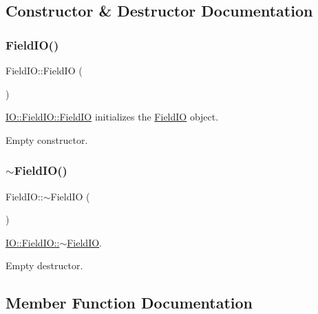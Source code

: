 \subsection{Constructor \& Destructor Documentation}
\mbox{\label{class_i_o_1_1_field_i_o_a8ea52cca792b1a0f7812881b5282edf5}} 
\subsubsection{\texorpdfstring{FieldIO()}{FieldIO()}}
{\footnotesize\ttfamily Field\+I\+O\+::\+Field\+IO (\begin{DoxyParamCaption}{ }\end{DoxyParamCaption})}



\mbox{\hyperlink{class_i_o_1_1_field_i_o_a8ea52cca792b1a0f7812881b5282edf5}{I\+O\+::\+Field\+I\+O\+::\+Field\+IO}} initializes the \mbox{\hyperlink{class_i_o_1_1_field_i_o}{Field\+IO}} object. 

Empty constructor. \mbox{\label{class_i_o_1_1_field_i_o_ae11a6e9e9a57b6f0f56718b82774af19}} 
\subsubsection{\texorpdfstring{$\sim$FieldIO()}{~FieldIO()}}
{\footnotesize\ttfamily Field\+I\+O\+::$\sim$\+Field\+IO (\begin{DoxyParamCaption}{ }\end{DoxyParamCaption})}



\mbox{\hyperlink{class_i_o_1_1_field_i_o_ae11a6e9e9a57b6f0f56718b82774af19}{I\+O\+::\+Field\+I\+O\+::$\sim$\+Field\+IO}}. 

Empty destructor. 

\subsection{Member Function Documentation}
\mbox{\label{class_i_o_1_1_field_i_o_a9093930584128c73a63fe8015bff9b38}} 
